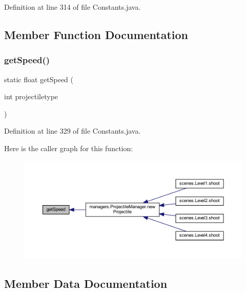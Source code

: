Definition at line 314 of file Constants.\+java.



\subsection{Member Function Documentation}
\mbox{\label{classhelpz_1_1_constants_1_1_projectiles_a28b031e39773be6063f30deedbaad662}} 
\subsubsection{\texorpdfstring{get\+Speed()}{getSpeed()}}
{\footnotesize\ttfamily static float get\+Speed (\begin{DoxyParamCaption}\item[{int}]{projectiletype }\end{DoxyParamCaption})\hspace{0.3cm}{\ttfamily [static]}}



Definition at line 329 of file Constants.\+java.

Here is the caller graph for this function\+:
\nopagebreak
\begin{figure}[H]
\begin{center}
\leavevmode
\includegraphics[width=350pt]{classhelpz_1_1_constants_1_1_projectiles_a28b031e39773be6063f30deedbaad662_icgraph}
\end{center}
\end{figure}


\subsection{Member Data Documentation}
\mbox{\label{classhelpz_1_1_constants_1_1_projectiles_aeedf9679be641870b99cd19b9bdcee1c}} 
